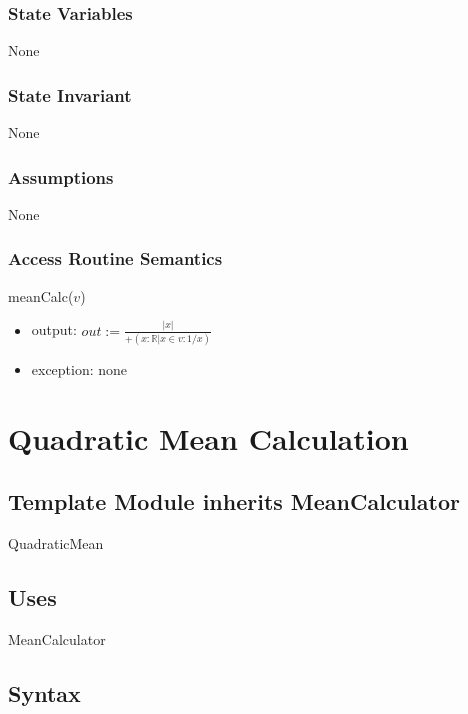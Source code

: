 \documentclass[12pt,fleqn]{examtst}
\begin{document}
\subsubsection* {State Variables}

None

\subsubsection* {State Invariant}

None

\subsubsection* {Assumptions}

None

\subsubsection* {Access Routine Semantics}

meanCalc($v$)
\begin{itemize}
\item output: $\mathit{out} := \frac{|x|}{+(x: \mathbb{R} | x \in v : 1/x)}$
\item exception: none
\end{itemize}


\newpage

\section* {Quadratic Mean Calculation}

\subsection*{Template Module inherits MeanCalculator}

QuadraticMean

\subsection* {Uses}

MeanCalculator

\subsection* {Syntax}
\end{document}
